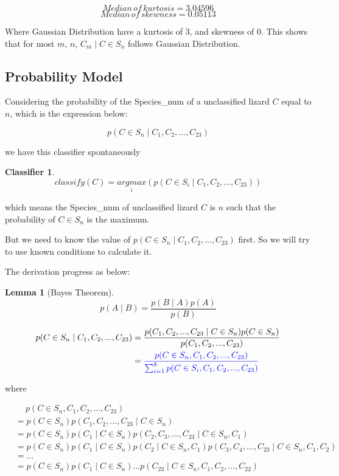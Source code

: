 \documentclass[12pt]{article}
\newtheorem{lemma}{Lemma}
\newtheorem{classifier}{Classifier}
\begin{document}
		$$Median \, of \, kurtosis = 3.04596$$
		$$Median \, of \, skewness = 0.05113$$
		
		Where Gaussian Distribution have a kurtosis of 3, and skewness of 0.
		This shows that for most $m$, $n$, $C_m \mid C \in S_n$ follows Gaussian Distribution.
	
	\subsection{Probability Model}
		
		Considering the probability of the Species\_num of a unclassified lizard $C$ equal to $n$,
		which is the expression below:
		
		$$p(C \in S_n \mid C_1, C_2, ..., C_{23})$$
		
		\noindent we have this classifier spontaneously
		
		\begin{classifier}
			$$classify(C)=\underset{i}{argmax}(p(C \in S_i \mid C_1, C_2, ..., C_{23}))$$
		\end{classifier}
		
		\noindent which means the Species\_num of unclassified lizard $C$ is $n$ such that
		the probability of $C \in S_n$ is the maximum.
		
		But we need to know the value of $p(C \in S_n \mid C_1, C_2, ..., C_{23})$ first.
		So we will try to use known conditions to calculate it.
		
		The derivation progress as below:
		
		\begin{lemma}[Bayes Theorem]
			$$p(A \mid B) = \dfrac{p(B \mid A)p(A)}{p(B)}$$
		\end{lemma}
		
		\begin{align*}
			  p(C \in S_n \mid C_1, C_2, ..., C_{23})
			&=\dfrac{p(C_1, C_2, ..., C_{23} \mid C \in S_n)p(C \in S_n)}{p(C_1, C_2, ..., C_{23})} \\
			&=\textcolor{blue}{\dfrac{p(C \in S_n, C_1, C_2, ..., C_{23})}{\sum^8_{i=1} p(C \in S_i, C_1, C_2, ..., C_{23})}}
		\end{align*}
		
		\noindent where
		
		\begin{align*}
			&\quad \ p(C \in S_n, C_1, C_2, ..., C_{23}) \\
			&=p(C \in S_n)p(C_1, C_2, ..., C_{23} \mid C \in S_n) \\
			&=p(C \in S_n)p(C_1 \mid C \in S_n)p(C_2, C_3, ..., C_{23} \mid C \in S_n, C_1) \\
			&=p(C \in S_n)p(C_1 \mid C \in S_n)p(C_2 \mid C \in S_n, C_1)p(C_3, C_4, ..., C_{23} \mid C \in S_n, C_1, C_2) \\
			&=... \\
			&=p(C \in S_n)p(C_1 \mid C \in S_n)...p(C_{23} \mid C \in S_n, C_1, C_2, ..., C_{22})
		\end{align*}
		
\end{document}
